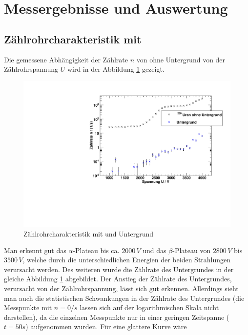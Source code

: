 \section{Messergebnisse und Auswertung}

\subsection{Zählrohrcharakteristik mit \uran}
\label{sub:eval:uran}
Die gemessene Abhängigkeit der Zählrate $n$ von \uran ohne Untergrund von der Zählrohrspannung $U$ wird in der Abbildung \ref{img:char:uran} gezeigt.
\begin{figure}[H]
\begin{center}
  \includegraphics[width=15cm]{../img/Uran238_Charakteristik.pdf}
  \caption[Zählrohrcharakteristik mit \uran]{Zählrohrcharakteristik mit \uran und Untergrund}
  \label{img:char:uran}
\end{center}
\end{figure}
Man erkennt gut das $\alpha$-Plateau bis ca. $2000\,V$ und das $\beta$-Plateau von $2800\,V$ bis $3500\,V$, welche durch die 
unterschiedlichen Energien der beiden Strahlungen verursacht werden. Des weiteren wurde die Zählrate des Untergrundes in der gleiche Abbildung 
\ref{img:char:uran} abgebildet. Der Anstieg der Zählrate des Untergrundes, verursacht von der Zählrohrspannung, lässt sich gut erkennen. Allerdings 
sieht man auch die statistischen Schwankungen in der Zählrate des Untergrundes (die Messpunkte mit $n = 0 / s$ lassen sich auf der logarithmischen 
Skala nicht darstellen), da die einzelnen Messpunkte nur in einer geringen Zeitspanne ($t=50s$) aufgenommen wurden. Für eine glattere Kurve wäre 
